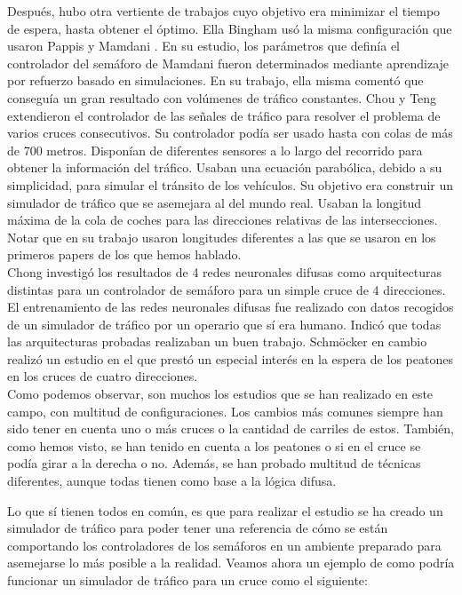 Después, hubo otra vertiente de trabajos cuyo objetivo era minimizar el tiempo de espera, hasta obtener el óptimo. Ella Bingham \cite{Ella} usó la misma configuración que usaron Pappis y Mamdani \cite{Mamdani}. En su estudio, los parámetros que definía el controlador del semáforo de Mamdani fueron determinados mediante aprendizaje por refuerzo basado en simulaciones. En su trabajo, ella misma comentó que conseguía un gran resultado con volúmenes de tráfico constantes. Chou y Teng \cite{Chou} extendieron el controlador de las señales de tráfico para resolver el problema de varios cruces consecutivos. Su controlador podía ser usado hasta con colas de más de 700 metros. Disponían de diferentes sensores a lo largo del recorrido para obtener la información del tráfico. Usaban una ecuación parabólica, debido a su simplicidad, para simular el tránsito de los vehículos. Su objetivo era construir un simulador de tráfico que se asemejara al del mundo real. Usaban la longitud máxima de la cola de coches para las direcciones relativas de las intersecciones. Notar que en su trabajo usaron longitudes diferentes a las que se usaron en los primeros papers de los que hemos hablado.\\

Chong \cite{Chong} investigó los resultados de 4 redes neuronales difusas como arquitecturas distintas para un controlador de semáforo para un simple cruce de 4 direcciones. El entrenamiento de las redes neuronales difusas fue realizado con datos recogidos de un simulador de tráfico por un operario que sí era humano.
Indicó que todas las arquitecturas probadas realizaban un buen trabajo. Schmöcker \cite{Scho} en cambio realizó un estudio en el que prestó un especial interés en la espera de los peatones en los cruces de cuatro direcciones.\\

Como podemos observar, son muchos los estudios que se han realizado en este campo, con multitud de configuraciones. Los cambios más comunes siempre han sido tener en cuenta uno o más cruces o la cantidad de carriles de estos. También, como hemos visto, se han tenido en cuenta a los peatones o si en el cruce se podía girar a la derecha o no. Además, se han probado multitud de técnicas diferentes, aunque todas tienen como base a la lógica difusa. 

\newpage
Lo que sí tienen todos en común, es que para realizar el estudio se ha creado un simulador de tráfico para poder tener una referencia de cómo se están comportando los controladores de los semáforos en un ambiente preparado para asemejarse lo más posible a la realidad. Veamos ahora un ejemplo de como podría funcionar un simulador de tráfico para un cruce como el siguiente:

